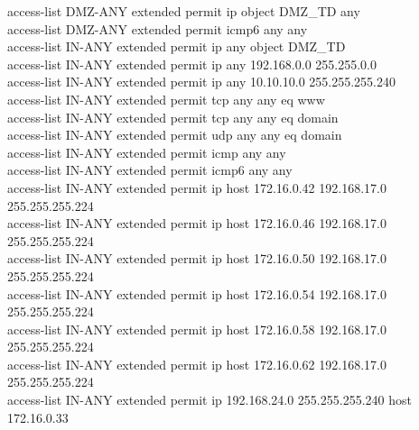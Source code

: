\documentclass[a4paper, 12pt]{article}
\begin{document}
{\hspace*{1cm}access-list DMZ-ANY extended permit ip object DMZ\_TD any\\
\hspace*{1cm}access-list DMZ-ANY extended permit icmp6 any any\\
\hspace*{1cm}access-list IN-ANY extended permit ip any object DMZ\_TD\\
\hspace*{1cm}access-list IN-ANY extended permit ip any 192.168.0.0 255.255.0.0\\
\hspace*{1cm}access-list IN-ANY extended permit ip any 10.10.10.0 255.255.255.240\\
\hspace*{1cm}access-list IN-ANY extended permit tcp any any eq www\\
\hspace*{1cm}access-list IN-ANY extended permit tcp any any eq domain\\
\hspace*{1cm}access-list IN-ANY extended permit udp any any eq domain\\
\hspace*{1cm}access-list IN-ANY extended permit icmp any any\\
\hspace*{1cm}access-list IN-ANY extended permit icmp6 any any\\
\hspace*{1cm}access-list IN-ANY extended permit ip host 172.16.0.42 192.168.17.0 255.255.255.224\\
\hspace*{1cm}access-list IN-ANY extended permit ip host 172.16.0.46 192.168.17.0 255.255.255.224\\
\hspace*{1cm}access-list IN-ANY extended permit ip host 172.16.0.50 192.168.17.0 255.255.255.224\\
\hspace*{1cm}access-list IN-ANY extended permit ip host 172.16.0.54 192.168.17.0 255.255.255.224\\
\hspace*{1cm}access-list IN-ANY extended permit ip host 172.16.0.58 192.168.17.0 255.255.255.224\\
\hspace*{1cm}access-list IN-ANY extended permit ip host 172.16.0.62 192.168.17.0 255.255.255.224\\
\hspace*{1cm}access-list IN-ANY extended permit ip 192.168.24.0 255.255.255.240 host 172.16.0.33\\
}
\end{document}
